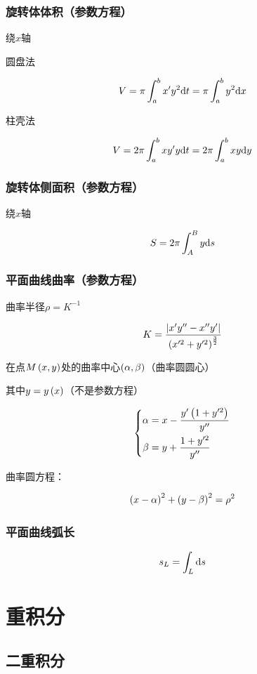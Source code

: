 \documentclass{article}
\begin{document}
\subsubsection{旋转体体积（参数方程）}

绕$x$轴

圆盘法

\[V=\pi\int_a^bx^\prime y^2\mathrm d t=\pi\int_a^by^2\mathrm d x\]

柱壳法

\[V=2\pi\int_a^bxy^\prime y\mathrm d t=2\pi\int_a^bxy\mathrm d y\]

\subsubsection{旋转体侧面积（参数方程）}

绕$x$轴

\[S=2\pi\int_A^By\mathrm d s\]

\subsubsection{平面曲线曲率（参数方程）}

曲率半径$\rho=K^{-1}$

\[K=\frac{\left|x^\prime y^{\prime\prime}-x^{\prime\prime}y^\prime\right|}{\left(x^{\prime2}+y^{\prime2}\right)^\frac32}\]

在点$M\left(x,y\right)$处的曲率中心$\left(\alpha,\beta\right)$（曲率圆圆心）

其中$y=y\left(x\right)$（不是参数方程）

\[\left\{\begin{aligned}
        \alpha & =x-\frac{y^\prime\left(1+y^{\prime2}\right)}{y^{\prime\prime}} \\
        \beta  & =y+\frac{1+y^{\prime2}}{y^{\prime\prime}}
    \end{aligned}\right.\]

曲率圆方程：

\[\left(x-\alpha\right)^2+\left(y-\beta\right)^2=\rho^2\]

\subsubsection{平面曲线弧长}

\[s_L=\int_L\mathrm d s\]

\section{重积分}

\subsection{二重积分}
\end{document}
